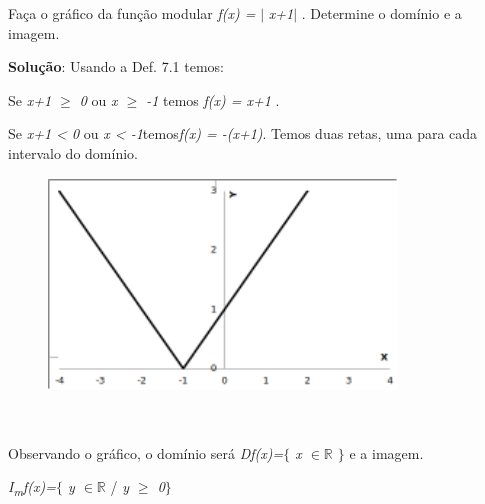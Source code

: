 \begin{texemplo}

Faça o gráfico da função modular \textit{f(x) =} $ \vert $ \textit{x+1}$ \vert $ . Determine o domínio e a imagem.  

\textbf{Solução}: Usando a Def. 7.1 temos:

\quad Se \textit{x+1 $ \geq $  0} ou \textit{x $ \geq $ -1} temos \textit{f(x) = x+1 }.

\quad Se \textit{x+1 < 0} ou \textit{ x < -1}temos\textit{f(x) = -(x+1)}. Temos duas retas, uma para cada intervalo do domínio.

\begin{figure}[H]
	\begin{Center}
		\includegraphics[width=3.65in,height=2.23in]{capitulos/outras_funcoes/media/image31.pdf}
	\end{Center}
\end{figure}

~~

\quad Observando o gráfico, o domínio será   \textit{Df(x)=$ \{ $ x $ \in \mathbb{R} $  \textbf{ }$ \} $ } e a imagem.

\quad \textit{I\textsubscript{m}f(x)=$ \{ $ y $ \in \mathbb{R} $  }/ \textit{y $ \geq $  0$ \} $ } \qedsymbol{}
\end{texemplo}

